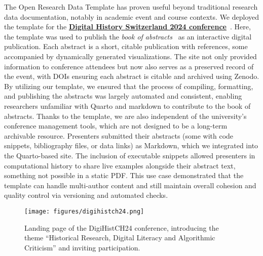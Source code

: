 \documentclass[final]{anthology-ch} %
\begin{document}
The Open Research Data Template has proven useful beyond traditional research data documentation, notably in academic event and course contexts. We deployed the template for the \href{https://digihistch24.github.io/}{\textbf{Digital History Switzerland 2024 conference}}~\cite{baudry2024b}. Here, the template was used to publish the \emph{book of abstracts}~\cite{baudry2024a} as an interactive digital publication. Each abstract is a short, citable publication with references, some accompanied by dynamically generated visualizations. The site not only provided information to conference attendees but now also serves as a preserved record of the event, with DOIs ensuring each abstract is citable and archived using Zenodo. By utilizing our template, we ensured that the process of compiling, formatting, and publishing the abstracts was largely automated and consistent, enabling researchers unfamiliar with Quarto and markdown to contribute to the book of abstracts. Thanks to the template, we are also independent of the university's conference management tools, which are not designed to be a long-term archivable resource. Presenters submitted their abstracts (some with code snippets, bibliography files, or data links) as Markdown, which we integrated into the Quarto-based site. The inclusion of executable snippets allowed presenters in computational history to share live examples alongside their abstract text, something not possible in a static PDF. This use case demonstrated that the template can handle multi-author content and still maintain overall cohesion and quality control via versioning and automated checks.

\begin{figure}[t!]
  \centering
  \texttt{[image: figures/digihistch24.png]}
  \caption{Landing page of the DigiHistCH24 conference, introducing the theme ``Historical Research, Digital Literacy and Algorithmic Criticism'' and inviting participation.}
  \label{fig-digihist24}
\end{figure}
\end{document}
